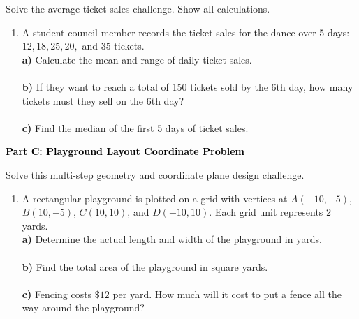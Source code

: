 \documentclass[12pt, letterpaper, fleqn]{article}
\newcommand{\blanklong}{\underline{\hspace{6.5cm}}}
\begin{document}
\vspace{3mm}

\noindent
Solve the average ticket sales challenge. Show all calculations.

\vspace{5mm}

\begin{enumerate}[itemsep=2.5cm, leftmargin=0.6cm]
\item A student council member records the ticket sales for the dance over 5 days: $12, 18, 25, 20,$ and $35$ tickets. \\
\textbf{a)} Calculate the mean and range of daily ticket sales. \\
\blanklong \\
\textbf{b)} If they want to reach a total of 150 tickets sold by the 6th day, how many tickets must they sell on the 6th day? \\
\blanklong \\
\textbf{c)} Find the median of the first 5 days of ticket sales. \\
\blanklong
\end{enumerate}

\newpage

\begin{tcolorbox}[colback=black!10]
    \large\textcolor{black}{\textbf{Part C: Playground Layout Coordinate Problem}}
\end{tcolorbox}

\vspace{3mm}

\noindent
Solve this multi-step geometry and coordinate plane design challenge.

\vspace{5mm}

\begin{enumerate}[itemsep=2.5cm, leftmargin=0.6cm]
\item A rectangular playground is plotted on a grid with vertices at $A(-10, -5)$, $B(10, -5)$, $C(10, 10)$, and $D(-10, 10)$. Each grid unit represents $2$ yards. \\
\textbf{a)} Determine the actual length and width of the playground in yards. \\
\blanklong \\
\textbf{b)} Find the total area of the playground in square yards. \\
\blanklong \\
\textbf{c)} Fencing costs $\$12$ per yard. How much will it cost to put a fence all the way around the playground? \\
\blanklong
\end{enumerate}
\end{document}
